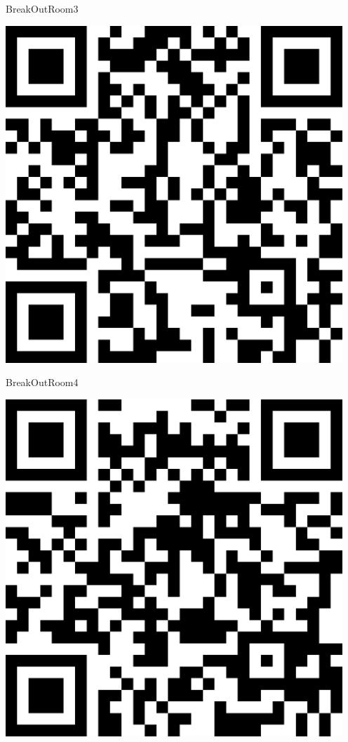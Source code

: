 \documentclass[letterpaper]{article}
\begin{document}
 \hfill{\small BreakOutRoom3} 

 \vspace{1in} 
 \pagebreak 
{} 
 \vspace*{\fill} 
 \begingroup 
 \centerline{\includegraphics[scale=1,width=5in,height=5in]{BreakOutRoom4.png}} 
 \endgroup 
 \vspace*{\fill} 

 \hfill{\small BreakOutRoom4} 

 \vspace{1in} 
 \pagebreak 
{} 
 \vspace*{\fill} 
 \begingroup 
 \centerline{\includegraphics[scale=1,width=5in,height=5in]{CSOffice.png}} 
 \endgroup 
 \vspace*{\fill} 
\end{document}

